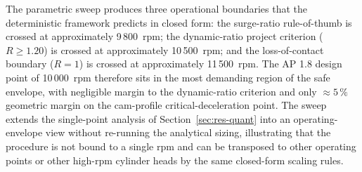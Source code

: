 \begin{table}[!htbp]
\caption{Parametric sweep of the two speed-sensitive indicators across the engine-speed range 6\,000--12\,000~rpm for the AP 1.8 head at fixed geometry. The dynamic-ratio criterion is $R\geq 1.20$ and the surge-ratio rule-of-thumb is $f_{n}/f_{\mathrm{cam}}\geq 4$. The intersection of the two pass criteria defines an analytical safe-operation envelope of approximately 6\,000--10\,500~rpm for the baseline configuration; barriers transition to at-risk above this band and the loss-of-contact boundary ($R\to 1$) is crossed near 11\,500~rpm.}\label{tbl:rpm-sweep}
\centering
{}
\end{table}

\noindent The parametric sweep produces three operational
boundaries that the deterministic framework predicts in closed form:
the surge-ratio rule-of-thumb is crossed at approximately
9\,800~rpm; the dynamic-ratio project criterion
($R\geq 1.20$) is crossed at approximately 10\,500~rpm; and the
loss-of-contact boundary ($R=1$) is crossed at approximately
11\,500~rpm. The AP 1.8 design point of 10\,000~rpm therefore sits
in the most demanding region of the safe envelope, with negligible
margin to the dynamic-ratio criterion and only $\approx 5\,\%$
geometric margin on the cam-profile critical-deceleration point. The
sweep extends the single-point analysis of
Section~\ref{sec:res-quant} into an operating-envelope view without
re-running the analytical sizing, illustrating that the procedure is
not bound to a single rpm and can be transposed to other operating
points or other high-rpm cylinder heads by the same closed-form
scaling rules.


